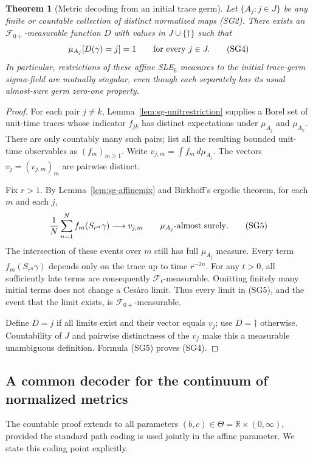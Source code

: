 \documentclass[11pt]{article}
\newtheorem{theorem}{Theorem}[section]
\theoremstyle{definition}\newtheorem{definition}[theorem]{Definition}
\theoremstyle{remark}\newtheorem{remark}[theorem]{Remark}
\begin{document}
\begin{theorem}[Metric decoding from an initial trace germ]
\label{thm:sg-decoder}
Let $\{A_j:j\in J\}$ be any finite or countable collection of distinct
normalized maps (SG2). There exists an $\mathcal F_{0+}$-measurable function
$D$ with values in $J\cup\{\dagger\}$ such that
\[
 \mu_{A_j}[D(\gamma)=j]=1\qquad\hbox{for every }j\in J.
 \tag{SG4}
\]
In particular, restrictions of these affine SLE$_6$ measures to the initial
trace-germ sigma-field are mutually singular, even though each separately
has its usual almost-sure germ zero-one property.
\end{theorem}
\begin{proof}
For each pair $j\ne k$, Lemma~\ref{lem:sg-unitrestriction} supplies a Borel
set of unit-time traces whose indicator $f_{jk}$ has distinct expectations
under $\mu_{A_j}$ and $\mu_{A_k}$. There are only countably many such pairs;
list all the resulting bounded unit-time observables as $(f_m)_{m\geq1}$.
Write $v_{j,m}=\int f_m\,d\mu_{A_j}$. The vectors
$v_j=(v_{j,m})_m$ are pairwise distinct.

Fix $r>1$. By Lemma~\ref{lem:sg-affinemix} and Birkhoff's ergodic theorem,
for each $m$ and each $j$,
\[
 \frac1N\sum_{n=1}^N f_m(S_{r^n}\gamma)
 \longrightarrow v_{j,m}\qquad\mu_{A_j}\hbox{-almost surely}.
 \tag{SG5}
\]
The intersection of these events over $m$ still has full $\mu_{A_j}$ measure.
Every term $f_m(S_{r^n}\gamma)$ depends only on the trace up to time
$r^{-2n}$. For any $t>0$, all sufficiently late terms are consequently
$\mathcal F_t$-measurable. Omitting finitely many initial terms does not
change a Ces\`aro limit. Thus every limit in (SG5), and the event that the
limit exists, is $\mathcal F_{0+}$-measurable.

Define $D=j$ if all limits exist and their vector equals $v_j$; use
$D=\dagger$ otherwise. Countability of $J$ and pairwise distinctness of the
$v_j$ make this a measurable unambiguous definition. Formula (SG5) proves
(SG4).
\end{proof}


\subsection{A common decoder for the continuum of normalized metrics}

The countable proof extends to all parameters $(b,c)\in\Theta
=\mathbb R\times(0,\infty)$, provided the standard path coding is used
jointly in the affine parameter. We state this coding point explicitly.
\end{document}
